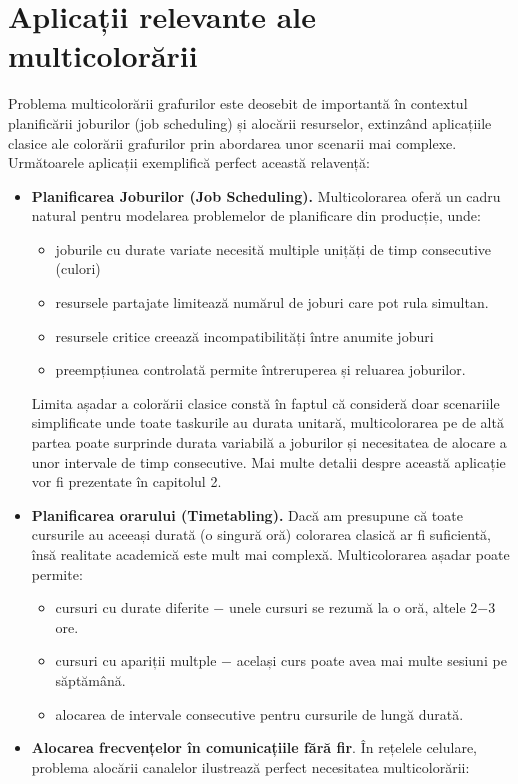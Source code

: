 \section{Aplicații relevante ale multicolorării}
Problema multicolorării grafurilor este deosebit de importantă în contextul planificării joburilor (job scheduling) și alocării resurselor, extinzând aplicațiile clasice ale colorării grafurilor prin abordarea unor scenarii mai complexe. Următoarele aplicații exemplifică perfect această relavență:
\begin{itemize}
  \item {\bf Planificarea Joburilor (Job Scheduling).} Multicolorarea oferă un cadru natural pentru modelarea problemelor de planificare din producție, unde:
   \begin{itemize}
    \item joburile cu durate variate necesită multiple unițăți de timp consecutive (culori)
    \item resursele partajate limitează numărul de joburi care pot rula simultan.
    \item resursele critice creează incompatibilități între anumite joburi
    \item preempțiunea controlată permite întreruperea și reluarea joburilor.
   \end{itemize}
   Limita așadar a colorării clasice constă în faptul că consideră doar scenariile simplificate unde toate taskurile au durata unitară, multicolorarea pe de altă partea poate surprinde durata variabilă a joburilor și necesitatea de alocare a unor intervale de timp consecutive.
   Mai multe detalii despre această aplicație vor fi prezentate în capitolul 2.
  \item {\bf Planificarea orarului (Timetabling).} Dacă am presupune că toate cursurile au aceeași durată (o singură oră) colorarea clasică ar fi suficientă, însă realitate academică este mult mai complexă. Multicolorarea așadar poate permite:
  \begin{itemize}
    \item cursuri cu durate diferite $-$ unele cursuri se rezumă la o oră, altele 2$-$3 ore.
    \item cursuri cu apariții multple $-$ același curs poate avea mai multe sesiuni pe săptămână.
    \item alocarea de intervale consecutive pentru cursurile de lungă durată. 
  \end{itemize}
  \item {\bf Alocarea frecvențelor în comunicațiile fără fir}. În rețelele celulare, problema alocării canalelor ilustrează perfect necesitatea multicolorării:

\end{itemize}

